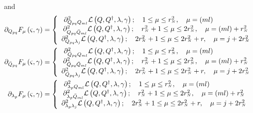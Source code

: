 \documentclass[aps,preprint]{revtex4}%
\begin{document}
and
\begin{align}
\partial_{Q_{pq}}F_{\mu}\left(  \varsigma,\gamma\right)   &  =\left\{
\begin{array}
[c]{c}%
\partial_{Q_{pq}Q_{ml}}^{2}\mathcal{L}\left(  Q,Q^{\dagger},\lambda
,\gamma\right)  ;\quad1\leq\mu\leq r_{^{N}}^{2},\quad\mu=\left(  ml\right)
\qquad\qquad\quad\\
\partial_{Q_{pq}\bar{Q}_{ml}}^{2}\mathcal{L}\left(  Q,Q^{\dagger}%
,\lambda,\gamma\right)  ;\quad r_{^{N}}^{2}+1\leq\mu\leq2r_{^{N}}^{2},\quad
\mu=\left(  ml\right)  +r_{^{N}}^{2}\\
\partial_{Q_{pq}\lambda_{j}}^{2}\mathcal{L}\left(  Q,Q^{\dagger}%
,\lambda,\gamma\right)  ;\quad2r_{^{N}}^{2}+1\leq\mu\leq2r_{^{N}}^{2}%
+r,\quad\mu=j+2r_{^{N}}^{2}%
\end{array}
\right. \nonumber\\
\partial_{\bar{Q}_{pq}}F_{\mu}\left(  \varsigma,\gamma\right)   &  =\left\{
\begin{array}
[c]{c}%
\partial_{\bar{Q}_{pq}Q_{ml}}^{2}\mathcal{L}\left(  Q,Q^{\dagger}%
,\lambda,\gamma\right)  ;\quad1\leq\mu\leq r_{^{N}}^{2},\quad\mu=\left(
ml\right)  \qquad\qquad\quad\\
\partial_{\bar{Q}_{pq}\bar{Q}_{ml}}^{2}\mathcal{L}\left(  Q,Q^{\dagger
},\lambda,\gamma\right)  ;\quad r_{^{N}}^{2}+1\leq\mu\leq2r_{^{N}}^{2}%
,\quad\mu=\left(  ml\right)  +r_{^{N}}^{2}\\
\partial_{\bar{Q}_{pq}\lambda_{j}}^{2}\mathcal{L}\left(  Q,Q^{\dagger}%
,\lambda,\gamma\right)  ;\quad2r_{^{N}}^{2}+1\leq\mu\leq2r_{^{N}}^{2}%
+r,\quad\mu=j+2r_{^{N}}^{2}%
\end{array}
\right. \nonumber\\
\partial_{\lambda_{p}}F_{\mu}\left(  \varsigma,\gamma\right)   &  =\left\{
\begin{array}
[c]{c}%
\partial_{\lambda_{p}Q_{ml}}^{2}\mathcal{L}\left(  Q,Q^{\dagger}%
,\lambda,\gamma\right)  ;\quad1\leq\mu\leq r_{^{N}}^{2},\quad\mu=\left(
ml\right)  \qquad\qquad\quad\\
\partial_{\lambda_{p}\bar{Q}_{ml}}^{2}\mathcal{L}\left(  Q,Q^{\dagger}%
,\lambda,\gamma\right)  ;\quad r_{^{N}}^{2}+1\leq\mu\leq2r_{^{N}}^{2},\quad
\mu=\left(  ml\right)  +r_{^{N}}^{2}\\
\partial_{\lambda_{p}\lambda_{j}}^{2}\mathcal{L}\left(  Q,Q^{\dagger}%
,\lambda,\gamma\right)  ;\quad2r_{^{N}}^{2}+1\leq\mu\leq2r_{^{N}}^{2}%
+r,\quad\mu=j+2r_{^{N}}^{2}%
\end{array}
\right. \nonumber\\

\end{align}
\end{document}
